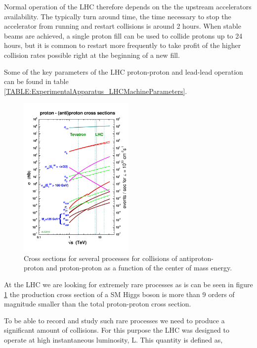 Normal operation of the \gls{LHC} therefore depends on the the upstream accelerators availability. The typically turn around time, the time necessary to stop the accelerator from running and restart collisions is around 2 hours. When stable beams are achieved, a single proton fill can be used to collide protons up to 24 hours, but it is common to restart more frequently to take profit of the higher collision rates possible right at the beginning of a new fill.

Some of the key parameters of the LHC proton-proton and lead-lead operation can be found in table \ref{TABLE:ExperimentalApparatus_LHCMachineParameters}.



\begin{figure}[!htb]
  \centering
  \includegraphics[width=0.50\textwidth]{Chapter02/LHC/Images/crosssections2012_v5}
  \caption{Cross sections for several processes for collisions of antiproton-proton and proton-proton as a function of the center of mass energy\cite{ARTICLE:TheCMSExperiment}.}
  \label{FIGURE:ExperimentalApparatus_LHCCrossSections}
\end{figure}

At the \gls{LHC} we are looking for extremely rare processes as is can be seen in figure \ref{FIGURE:ExperimentalApparatus_LHCCrossSections} the production cross section of a \gls{SM} Higgs boson is more than 9 orders of magnitude smaller than the total proton-proton cross section. 

To be able to record and study such rare processes we need to produce a significant amount of collisions. For this purpose the LHC was designed to operate at high instantaneous luminosity, L. This quantity is defined as,

